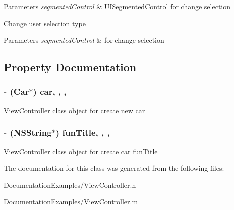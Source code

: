\begin{DoxyParams}{Parameters}
{\em segmented\+Control} & U\+I\+Segmented\+Control for change selection\\
\hline
\end{DoxyParams}
Change user selection type


\begin{DoxyParams}{Parameters}
{\em segmented\+Control} & for change selection \\
\hline
\end{DoxyParams}


\subsection{Property Documentation}
\hypertarget{interface_view_controller_aa6bc7a298fc7c20538a2b91787969ae6}{}
\subsubsection[{car}]{\setlength{\rightskip}{0pt plus 5cm}-\/ ({\bf Car}$\ast$) car\hspace{0.3cm}{\ttfamily [read]}, {\ttfamily [write]}, {\ttfamily [nonatomic]}, {\ttfamily [assign]}}\label{interface_view_controller_aa6bc7a298fc7c20538a2b91787969ae6}
\hyperlink{interface_view_controller}{View\+Controller} class object for create new car \hypertarget{interface_view_controller_a2983301c81b8a147d15df749fab98724}{}
\subsubsection[{fun\+Title}]{\setlength{\rightskip}{0pt plus 5cm}-\/ (N\+S\+String$\ast$) fun\+Title\hspace{0.3cm}{\ttfamily [read]}, {\ttfamily [write]}, {\ttfamily [nonatomic]}, {\ttfamily [assign]}}\label{interface_view_controller_a2983301c81b8a147d15df749fab98724}
\hyperlink{interface_view_controller}{View\+Controller} class object for create car fun\+Title 

The documentation for this class was generated from the following files\+:\begin{DoxyCompactItemize}
\item 
Documentation\+Examples/View\+Controller.\+h\item 
Documentation\+Examples/View\+Controller.\+m\end{DoxyCompactItemize}
